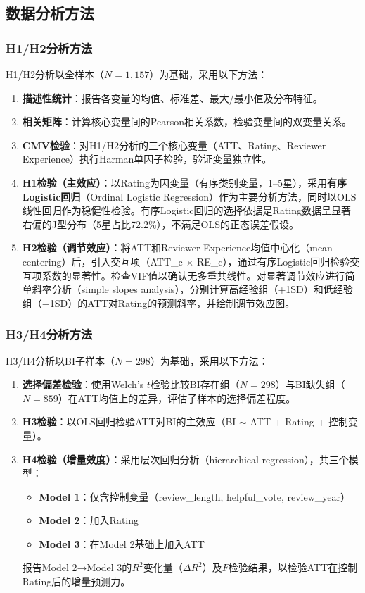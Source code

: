 \subsection{数据分析方法}

\subsubsection{H1/H2分析方法}

H1/H2分析以全样本（$N=1{,}157$）为基础，采用以下方法：

\begin{enumerate}
  \item \textbf{描述性统计}：报告各变量的均值、标准差、最大/最小值及分布特征。
  \item \textbf{相关矩阵}：计算核心变量间的Pearson相关系数，检验变量间的双变量关系。
  \item \textbf{CMV检验}：对H1/H2分析的三个核心变量（ATT、Rating、Reviewer Experience）执行Harman单因子检验，验证变量独立性。
  \item \textbf{H1检验（主效应）}：以Rating为因变量（有序类别变量，1--5星），采用\textbf{有序Logistic回归}（Ordinal Logistic Regression）作为主要分析方法，同时以OLS线性回归作为稳健性检验。有序Logistic回归的选择依据是Rating数据呈显著右偏的J型分布（5星占比72.2\%），不满足OLS的正态误差假设\cite{duan2023,kim2022}。
  \item \textbf{H2检验（调节效应）}：将ATT和Reviewer Experience均值中心化（mean-centering）后，引入交互项（ATT\_c $\times$ RE\_c），通过有序Logistic回归检验交互项系数的显著性。检查VIF值以确认无多重共线性。对显著调节效应进行简单斜率分析（simple slopes analysis），分别计算高经验组（+1SD）和低经验组（$-$1SD）的ATT对Rating的预测斜率，并绘制调节效应图。
\end{enumerate}

\subsubsection{H3/H4分析方法}

H3/H4分析以BI子样本（$N=298$）为基础，采用以下方法：

\begin{enumerate}
  \item \textbf{选择偏差检验}：使用Welch's $t$检验比较BI存在组（$N=298$）与BI缺失组（$N=859$）在ATT均值上的差异，评估子样本的选择偏差程度。
  \item \textbf{H3检验}：以OLS回归检验ATT对BI的主效应（BI $\sim$ ATT + Rating + 控制变量）。
  \item \textbf{H4检验（增量效度）}：采用层次回归分析（hierarchical regression），共三个模型：
    \begin{itemize}
      \item \textbf{Model 1}：仅含控制变量（review\_length, helpful\_vote, review\_year）
      \item \textbf{Model 2}：加入Rating
      \item \textbf{Model 3}：在Model 2基础上加入ATT
    \end{itemize}
    报告Model 2→Model 3的$R^2$变化量（$\Delta R^2$）及$F$检验结果，以检验ATT在控制Rating后的增量预测力。
\end{enumerate}


